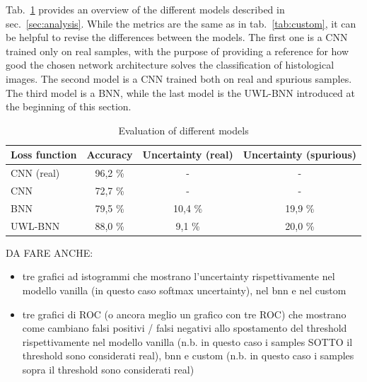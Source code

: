 \documentclass[11pt,twoside,a4paper]{article}
\begin{document}
Tab.~\ref{tab:colab} provides an overview of the different models described in sec.~\ref{sec:analysis}. While the metrics are the same as in tab.~\ref{tab:custom}, it can be helpful to revise the differences between the models. The first one is a CNN trained only on real samples, with the purpose of providing a reference for how good the chosen network architecture solves the classification of histological images.
The second model is a CNN trained both on real and spurious samples. The third model is a BNN, while the last model is the UWL-BNN introduced at the beginning of this section.


\begin{table}[!h]
  \begin{adjustwidth}{-.5in}{-.5in}
  \begin{center}
    \begin{tabular}{l | c | c | c}
      Loss function	& Accuracy	& Uncertainty (real)	& Uncertainty (spurious) \\
      \hline
      CNN (real)	& 96,2 \%		& - 				& - \\      
      CNN		& 72,7 \%		& - 				& - \\      
      BNN		& 79,5 \%		& 10,4 \% 			& 19,9 \% \\      
      UWL-BNN		& 88,0 \%		& 9,1  \% 			& 20,0 \% \\       
    \end{tabular}
    \caption{Evaluation of different models}
    \label{tab:colab}
  \end{center}
  \end{adjustwidth}
\end{table}

DA FARE ANCHE:
\begin{itemize}
\item tre grafici ad istogrammi che mostrano l'uncertainty rispettivamente nel modello vanilla (in questo caso softmax uncertainty), nel bnn e nel custom
\item tre grafici di ROC (o ancora meglio un grafico con tre ROC) che mostrano come cambiano falsi positivi / falsi negativi allo spostamento del threshold rispettivamente nel modello vanilla (n.b. in questo caso i samples SOTTO il threshold sono considerati real), bnn e custom (n.b. in questo caso i samples sopra il threshold sono considerati real)
\end{itemize}
\end{document}
